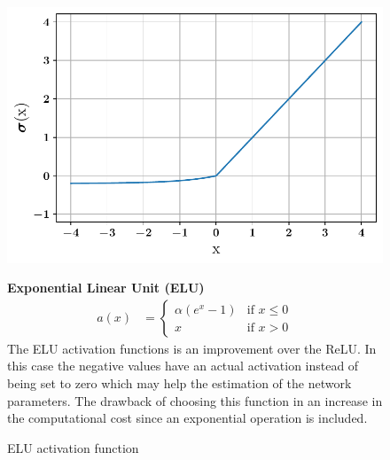 \begin{figure}[!h]
\begin{minipage}{0.45\textwidth}
    \centering
\includegraphics[width=\textwidth]{images/networks/act_elu.pdf}
\caption{ELU activation function}
    \label{fig:elu}
\end{minipage}
\hfill
\begin{minipage}{0.5\textwidth}
    \textbf{Exponential Linear Unit (ELU)}
   \begin{align}
        a(x) &= 
        \begin{cases}
        \alpha \left(e^x -1\right)  & \text{if } x \leq 0 \\
        x  & \text{if } x > 0 
  \end{cases}
\end{align}
The ELU activation functions is an improvement over the ReLU. In this case the negative values have an actual activation instead of being set to zero which may help the estimation of the network parameters. The drawback of choosing this function in an increase in the computational cost since an exponential operation is included. 
\end{minipage}
\end{figure}

